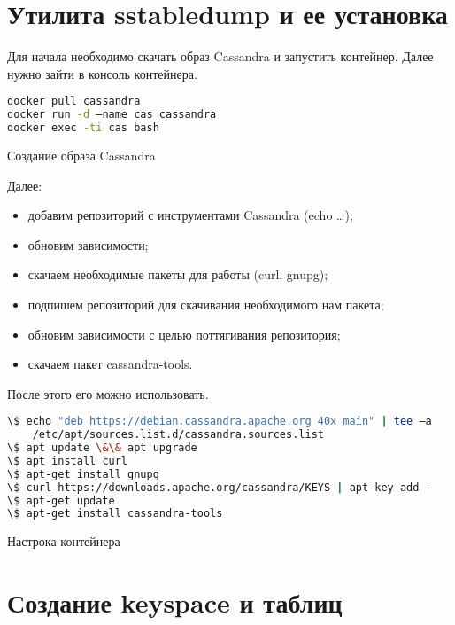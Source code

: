 \section{Утилита sstabledump и ее установка}

Для начала необходимо скачать образ Cassandra и запустить контейнер.
Далее нужно зайти в консоль контейнера.

\begin{lstlisting}[language=bash]
docker pull cassandra
docker run -d –name cas cassandra
docker exec -ti cas bash
\end{lstlisting}

\begin{image}
	\caption{Создание образа Cassandra}
	\label{fig:docker:cas}
\end{image}

Далее:
\begin{itemize}
	\item добавим репозиторий с инструментами Cassandra (echo …);
	\item обновим зависимости;
	\item скачаем необходимые пакеты для работы (curl, gnupg);
	\item подпишем репозиторий для скачивания необходимого нам пакета;
	\item обновим зависимости с целью поттягивания репозитория;
	\item скачаем пакет cassandra-tools.
\end{itemize}

После этого его можно использовать.

\begin{lstlisting}[language=bash]
\$ echo "deb https://debian.cassandra.apache.org 40x main" | tee –a
	/etc/apt/sources.list.d/cassandra.sources.list
\$ apt update \&\& apt upgrade
\$ apt install curl
\$ apt-get install gnupg
\$ curl https://downloads.apache.org/cassandra/KEYS | apt-key add -
\$ apt-get update
\$ apt-get install cassandra-tools
\end{lstlisting}

\begin{image}
	\caption{Настрока контейнера}
	\label{fig:docker:bash}
\end{image}

\section{Создание keyspace и таблиц}

